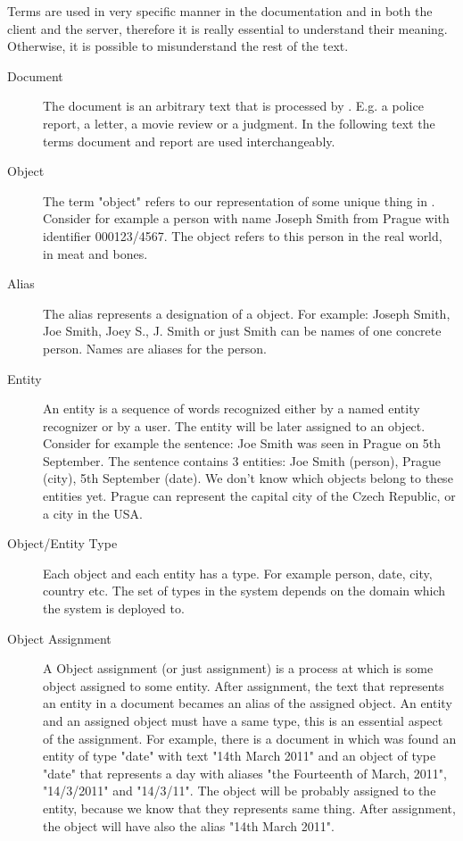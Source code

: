 Terms are used in very specific manner in the documentation and in both the
client and the server, therefore it is really essential to understand their
meaning. Otherwise, it is possible to misunderstand the rest of the text.

\begin{description}
\item[Document]
The document is an arbitrary text that is processed by \textan{}. E.g. a police
report, a letter, a movie review or a judgment. In the following text the terms
document and report are used interchangeably.

\item[Object]
The term "object" refers to our representation of some unique thing in
\textan{}. Consider for example a person with name Joseph Smith from Prague with
identifier 000123/4567. The object refers to this person in the real world, in
meat and bones.

\item[Alias]
The alias represents a designation of a object. For example: Joseph Smith, Joe
Smith, Joey S., J. Smith or just Smith can be names of one concrete person.
Names are aliases for the person.

\item[Entity]
An entity is a sequence of words recognized either by a named entity recognizer
or by a user. The entity will be later assigned to an object. Consider for example
the sentence: Joe Smith was seen in Prague on 5th September. The sentence contains
3 entities: Joe Smith (person), Prague (city), 5th September (date). We don't know
which objects belong to these entities yet. Prague can represent the capital city
of the Czech Republic, or a city in the USA.

\item[Object/Entity Type]
Each object and each entity has a type. For example person, date, city, country
etc. The set of types in the system depends on the domain which the system is
deployed to.

\item[Object Assignment]
A Object assignment (or just assignment) is a process at which is some object
assigned to some entity.  After assignment, the text that represents an entity
in a document becames an alias of the assigned object. An entity and an assigned
object must have a same type, this is an essential aspect of the assignment.
For example, there is a document in which was found an entity of type "date" with
text "14th March 2011" and an object of type "date" that represents a day with
aliases "the Fourteenth of March, 2011", "14/3/2011" and "14/3/11". The object will
be probably assigned to the entity, because we know that they represents same thing.
After assignment, the object will have also the alias "14th March 2011".


\end{description}
